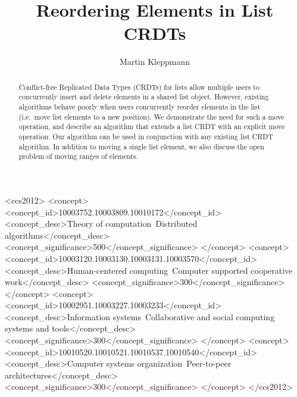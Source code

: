 \documentclass[sigplan,10pt]{acmart}
\begin{document}
\title{Reordering Elements in List CRDTs}

\author{Martin Kleppmann}

\begin{abstract}
Conflict-free Replicated Data Types (CRDTs) for lists allow multiple users to concurrently insert and delete elements in a shared list object.
However, existing algorithms behave poorly when users concurrently reorder elements in the list (i.e.\ move list elements to a new position).
We demonstrate the need for such a move operation, and describe an algorithm that extends a list CRDT with an explicit move operation.
Our algorithm can be used in conjunction with any existing list CRDT algorithm.
In addition to moving a single list element, we also discuss the open problem of moving ranges of elements.
\end{abstract}

\begin{CCSXML}
<ccs2012>
   <concept>
       <concept_id>10003752.10003809.10010172</concept_id>
       <concept_desc>Theory of computation~Distributed algorithms</concept_desc>
       <concept_significance>500</concept_significance>
   </concept>
   <concept>
       <concept_id>10003120.10003130.10003131.10003570</concept_id>
       <concept_desc>Human-centered computing~Computer supported cooperative work</concept_desc>
       <concept_significance>300</concept_significance>
   </concept>
   <concept>
       <concept_id>10002951.10003227.10003233</concept_id>
       <concept_desc>Information systems~Collaborative and social computing systems and tools</concept_desc>
       <concept_significance>300</concept_significance>
   </concept>
   <concept>
       <concept_id>10010520.10010521.10010537.10010540</concept_id>
       <concept_desc>Computer systems organization~Peer-to-peer architectures</concept_desc>
       <concept_significance>300</concept_significance>
   </concept>
 </ccs2012>
\end{CCSXML}

\end{document}
